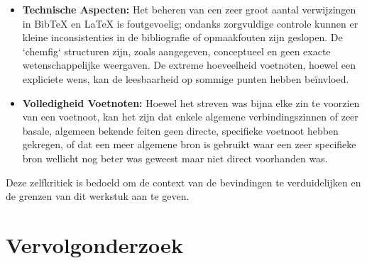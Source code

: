 \documentclass[11pt, a4paper]{report} %
\begin{document}
\begin{itemize}
    \item \textbf{Technische Aspecten:} Het beheren van een zeer groot aantal verwijzingen in BibTeX en LaTeX is foutgevoelig; ondanks zorgvuldige controle kunnen er kleine inconsistenties in de bibliografie of opmaakfouten zijn geslopen. De `chemfig` structuren zijn, zoals aangegeven, conceptueel en geen exacte wetenschappelijke weergaven. De extreme hoeveelheid voetnoten, hoewel een expliciete wens, kan de leesbaarheid op sommige punten hebben beïnvloed.
    \item \textbf{Volledigheid Voetnoten:} Hoewel het streven was bijna elke zin te voorzien van een voetnoot, kan het zijn dat enkele algemene verbindingszinnen of zeer basale, algemeen bekende feiten geen directe, specifieke voetnoot hebben gekregen, of dat een meer algemene bron is gebruikt waar een zeer specifieke bron wellicht nog beter was geweest maar niet direct voorhanden was.
\end{itemize}
Deze zelfkritiek is bedoeld om de context van de bevindingen te verduidelijken en de grenzen van dit werkstuk aan te geven.

\chapter{Vervolgonderzoek}
\label{ch:vervolgonderzoek}
\end{document}

